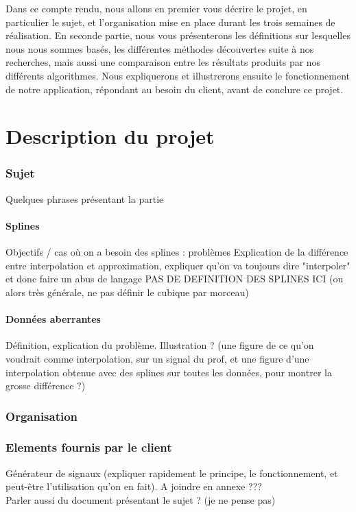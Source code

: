 \documentclass[a4paper,12pt]{article} %
\begin{document}
    Dans ce compte rendu, nous allons en premier vous décrire le projet, en particulier le sujet, et l'organisation mise en place durant les trois semaines de réalisation. En seconde partie, nous vous présenterons les définitions sur lesquelles nous nous sommes basés, les différentes méthodes découvertes suite à nos recherches, mais aussi une comparaison entre les résultats produits par nos différents algorithmes. Nous expliquerons et illustrerons ensuite le fonctionnement de notre application, répondant au besoin du client, avant de conclure ce projet.

\renewcommand\partname{}
\part{Description du projet}
	\section{Sujet}
		Quelques phrases présentant la partie
		\subsection{Splines}
			 Objectifs / cas où on a besoin des splines : problèmes
			Explication de la différence entre interpolation et approximation, expliquer qu'on va toujours dire "interpoler" et donc faire un abus de langage
			PAS DE DEFINITION DES SPLINES ICI (ou alors très générale, ne pas définir le cubique par morceau)
		\subsection{Données aberrantes}
			Définition, explication du problème. Illustration ? (une figure de ce qu'on voudrait comme interpolation, sur un signal du prof, et une figure d'une interpolation obtenue avec des splines sur toutes les données, pour montrer la grosse différence ?)
	\section{Organisation}
	\section{Elements fournis par le client}
		Générateur de signaux (expliquer rapidement le principe, le fonctionnement, et peut-être l'utilisation qu'on en fait). A joindre en annexe ???
		\\Parler aussi du document présentant le sujet ? (je ne pense pas)
\end{document}
